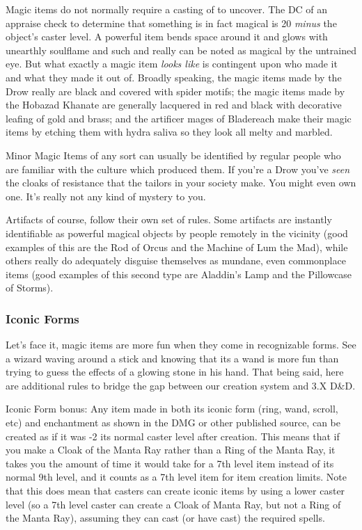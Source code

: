 Magic items do not normally require a casting of  to uncover. The DC of an appraise check to determine that something is in fact magical is 20 \textit{minus} the object's caster level. A powerful item bends space around it and glows with unearthly soulflame and such and really can be noted as magical by the untrained eye. But what exactly a magic item \textit{looks like} is contingent upon who made it and what they made it out of. Broadly speaking, the magic items made by the Drow really are black and covered with spider motifs; the magic items made by the Hobazad Khanate are generally lacquered in red and black with decorative leafing of gold and brass; and the artificer mages of Bladereach make their magic items by etching them with hydra saliva so they look all melty and marbled.

Minor Magic Items of any sort can usually be identified by regular people who are familiar with the culture which produced them. If you're a Drow you've \textit{seen} the cloaks of resistance that the tailors in your society make. You might even own one. It's really not any kind of mystery to you.

Artifacts of course, follow their own set of rules. Some artifacts are instantly identifiable as powerful magical objects by people remotely in the vicinity (good examples of this are the Rod of Orcus and the Machine of Lum the Mad), while others really do adequately disguise themselves as mundane, even commonplace items (good examples of this second type are Aladdin's Lamp and the Pillowcase of Storms).

\subsubsection{Iconic Forms}

Let's face it, magic items are more fun when they come in recognizable forms. See a wizard waving around a stick and knowing that its a wand is more fun than trying to guess the effects of a glowing stone in his hand. That being said, here are additional rules to bridge the gap between our creation system and 3.X D\&D.

Iconic Form bonus: Any item made in both its iconic form (ring, wand, scroll, etc) and enchantment as shown in the DMG or other published source, can be created as if it was -2 its normal caster level after creation. This means that if you make a Cloak of the Manta Ray rather than a Ring of the Manta Ray, it takes you the amount of time it would take for a 7th level item instead of its normal 9th level, and it counts as a 7th level item for item creation limits. Note that this does mean that casters can create iconic items by using a lower caster level (so a 7th level caster can create a Cloak of Manta Ray, but not a Ring of the Manta Ray), assuming they can cast (or have cast) the required spells.

